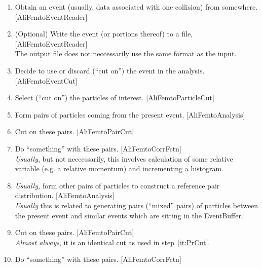 \documentclass[twoside]{article}
\newcommand{\name}[1]{\textsf{#1}}%
\begin{document}
\begin{enumerate}
\item\label{it:read}  Obtain an event (usually, data associated with one collision) from somewhere. [\name{AliFemtoEventReader}]
\item\label{it:write} (Optional) Write the event (or portions thereof) to a file,                       [\name{AliFemtoEventReader}]\\
                      The output file does not neccessarily use the same format as the input.
\item\label{it:EvCut} Decide to use or discard (``cut on'') the event in the analysis.               [\name{AliFemtoEventCut}]
\item\label{it:TrCut} Select (``cut on'') the particles of interest.                                 [\name{AliFemtoParticleCut}]
\item\label{it:Reals} Form pairs of particles coming from the present event.                         [\name{AliFemtoAnalysis}]
\item\label{it:PrCut} Cut on these pairs.                                                            [\name{AliFemtoPairCut}]
\item\label{it:Num}   Do ``something'' with these pairs.                                             [\name{AliFemtoCorrFctn}]\\
                      {\it Usually}, but not neccessarily, this involves calculation of some relative
                      variable (e.g. a relative momentum) and incrementing a histogram.
\item\label{it:Mix}   {\it Usually,} form other pairs of particles to construct a reference pair     
                      distribution.                                                                  [\name{AliFemtoAnalysis}]\\
                      {\it Usually} this is related to generating pairs (``mixed'' pairs) of
                      particles between the present event and similar events which are sitting in 
                      the EventBuffer.
\item\label{it:PrCut2} Cut on these pairs.                                                           [\name{AliFemtoPairCut}]\\
                      {\it Almost always}, it is an identical cut as used in step~\ref{it:PrCut}.
\item\label{it:Den}   Do ``something'' with these pairs.                                             [\name{AliFemtoCorrFctn}]\\

\end{enumerate}
\end{document}
